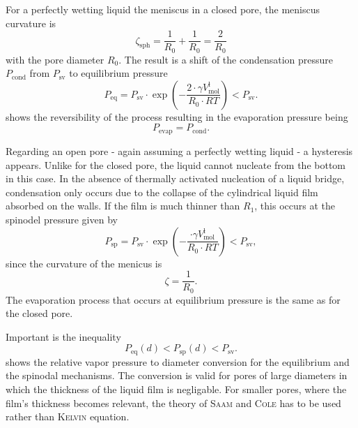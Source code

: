 \documentclass[../thesis.tex]{subfiles}
\begin{document}
      For a perfectly wetting liquid the meniscus in a closed pore, the meniscus curvature is
      \begin{equation*}
        \zeta_\mathrm{sph} = \frac{1}{R_0}+\frac{1}{R_0}=\frac{2}{R_0}
      \end{equation*}
      with the pore diameter $R_0$. The result is a shift of the condensation pressure $P_\mathrm{cond}$ from $P_\mathrm{sv}$ to equilibrium pressure
      \begin{equation}
        P_\mathrm{eq}=P_\mathrm{sv}\cdot\exp{\left(-\frac{2\cdot \gamma V_\mathrm{mol}^\mathrm{l}}{R_0\cdot RT}\right)}<P_\mathrm{sv}.
        \label{eq:p-eq}
      \end{equation}
       shows the reversibility of the process resulting in the evaporation pressure being
      \begin{equation*}
        P_\mathrm{evap}=P_\mathrm{cond}.
      \end{equation*}
      \medskip

      

      Regarding an open pore - again assuming a perfectly wetting liquid - a hysteresis appears. Unlike for the closed pore, the liquid cannot nucleate from the bottom in this case. In the absence of thermally activated nucleation of a liquid bridge, condensation only occurs due to the collapse of the cylindrical liquid film absorbed on the walls. If the film is much thinner than $R_1$, this occurs at the spinodel pressure given by
      \begin{equation}
        P_\mathrm{sp}=P_\mathrm{sv}\cdot\exp{\left(-\frac{\cdot \gamma V_\mathrm{mol}^\mathrm{l}}{R_0\cdot RT}\right)}<P_\mathrm{sv},
        \label{eq:p-sp}
      \end{equation}
      since the curvature of the menicus is
      \begin{equation*}
        \zeta = \frac{1}{R_0}.
      \end{equation*}
      The evaporation process that occurs at equilibrium pressure is the same as for the closed pore.

      Important is the inequality
      \begin{equation}
        P_\mathrm{eq}(d)<P_\mathrm{sp}(d)<P_\mathrm{sv}.
        \label{eq:cond-pressure-inequality}
      \end{equation}
       shows the relative vapor pressure to diameter conversion for the equilibrium and the spinodal mechanisms. The conversion is valid for pores of large diameters in which the thickness of the liquid film is negligable. For smaller pores, where the film's thickness becomes relevant, the theory of \textsc{Saam} and \textsc{Cole} has to be used rather than \textsc{Kelvin} equation.
\end{document}

